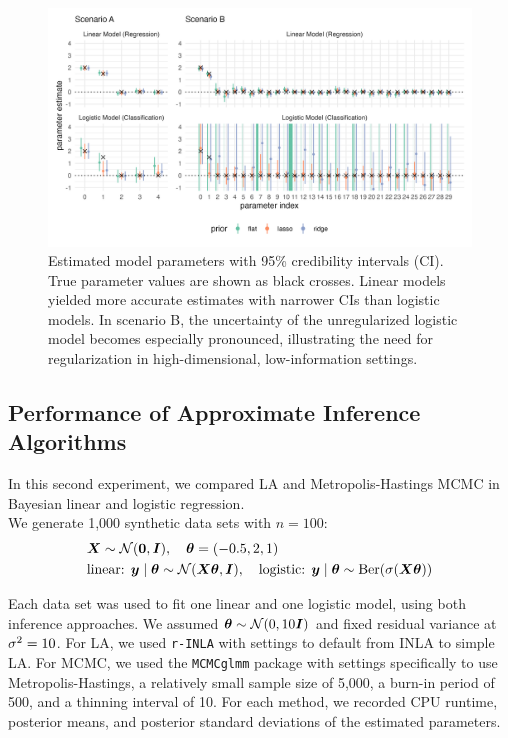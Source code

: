 \begin{figure}[htbp]
    \centering
    \includegraphics[width=\linewidth]{../figures/reg_all.png}
    \caption{Estimated model parameters with 95\% credibility intervals (CI).
    True parameter values are shown as black crosses.
    Linear models yielded more accurate estimates with narrower CIs than logistic models.
    In scenario B, the uncertainty of the unregularized logistic model becomes especially pronounced, illustrating the need for regularization in high-dimensional, low-information settings.
    }
    \label{fig:reg-params}
\end{figure}

\subsection{Performance of Approximate Inference Algorithms}

In this second experiment, we compared LA and Metropolis-Hastings MCMC in Bayesian linear and logistic regression.\\

We generate 1,000 synthetic data sets with $n=100$:
\begin{equation*}
    \begin{aligned}
        &\bm{X} \sim \mathcal{N}(\bm{0}, \bm{I}), \quad \bm{\theta} = (-0.5, 2, 1)\\
        &\text{linear: } \bm{y} \mid \bm{\theta} \sim \mathcal{N}(\bm{X} \bm{\theta}, \bm{I}),\quad \text{logistic: } \bm{y} \mid \bm{\theta} \sim \text{Ber}(\sigma(\bm{X} \bm{\theta}))
    \end{aligned}
\end{equation*}

Each data set was used to fit one linear and one logistic model, using both inference approaches.
We assumed $\bm{\theta} \sim \mathcal{N}(0, 10 \bm{I})$ and fixed residual variance  at $\sigma^2 = 10$.
For LA, we used \texttt{r-INLA} with settings to default from INLA to simple LA.
For MCMC, we used the \texttt{MCMCglmm} package with settings specifically to use Metropolis-Hastings, a relatively small sample size of 5,000, a burn-in period of 500, and a thinning interval of 10.
For each method, we recorded CPU runtime, posterior means, and posterior standard deviations of the estimated parameters.\\

